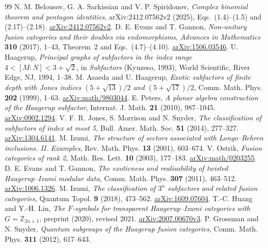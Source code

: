 \documentclass[11pt]{article}
\numberwithin{equation}{section}
\theoremstyle{definition}
\theoremstyle{remark}
\begin{document}
\begin{thebibliography}{99}
N. M. Belousov, G. A. Sarkissian and V. P. Spiridonov,
\emph{Complex binomial theorem and pentagon identities},
arXiv:2412.07562v2 (2025), Eqs.~(1.4)--(1.5) and (2.17)--(2.18).
\href{https://arxiv.org/abs/2412.07562v2}{arXiv:2412.07562v2}.
D. E. Evans and T. Gannon,
\emph{Non-unitary fusion categories and their doubles via endomorphisms},
\emph{Advances in Mathematics} \textbf{310} (2017), 1--43,
Theorem~2 and Eqs.~(4.7)--(4.10).
\href{https://arxiv.org/abs/1506.03546}{arXiv:1506.03546}.
U. Haagerup, \emph{Principal graphs of subfactors in the index range
$4<[M:N]<3+\sqrt2$}, in \emph{Subfactors} (Kyuzeso, 1993), World
Scientific, River Edge, NJ, 1994, 1--38.
M. Asaeda and U. Haagerup, \emph{Exotic subfactors of finite depth with
Jones indices $(5+\sqrt{13})/2$ and $(5+\sqrt{17})/2$}, Comm. Math.
Phys. \textbf{202} (1999), 1--63.
\href{https://arxiv.org/abs/math/9803044}{arXiv:math/9803044}.
E. Peters, \emph{A planar algebra construction of the Haagerup
subfactor}, Internat. J. Math. \textbf{21} (2010), 987--1045.
\href{https://arxiv.org/abs/0902.1294}{arXiv:0902.1294}.
V. F. R. Jones, S. Morrison and N. Snyder, \emph{The classification of
subfactors of index at most 5}, Bull. Amer. Math. Soc. \textbf{51}
(2014), 277--327.
\href{https://arxiv.org/abs/1304.6141}{arXiv:1304.6141}.
M. Izumi, \emph{The structure of sectors associated with Longo--Rehren
inclusions. II. Examples}, Rev. Math. Phys. \textbf{13} (2001), 603--674.
V. Ostrik, \emph{Fusion categories of rank 2}, Math. Res. Lett.
\textbf{10} (2003), 177--183.
\href{https://arxiv.org/abs/math/0203255}{arXiv:math/0203255}.
D. E. Evans and T. Gannon, \emph{The exoticness and realisability of
twisted Haagerup--Izumi modular data}, Comm. Math. Phys. \textbf{307}
(2011), 463--512.
\href{https://arxiv.org/abs/1006.1326}{arXiv:1006.1326}.
M. Izumi, \emph{The classification of $3^n$ subfactors and related
fusion categories}, Quantum Topol. \textbf{9} (2018), 473--562.
\href{https://arxiv.org/abs/1609.07604}{arXiv:1609.07604}.
T.-C. Huang and Y.-H. Lin, \emph{The $F$-symbols for transparent
Haagerup--Izumi categories with $G=\mathbb Z_{2n+1}$}, preprint (2020),
revised 2021.
\href{https://arxiv.org/abs/2007.00670v3}{arXiv:2007.00670v3}.
P. Grossman and N. Snyder, \emph{Quantum subgroups of the Haagerup
fusion categories}, Comm. Math. Phys. \textbf{311} (2012), 617--643.

\end{thebibliography}
\end{document}
